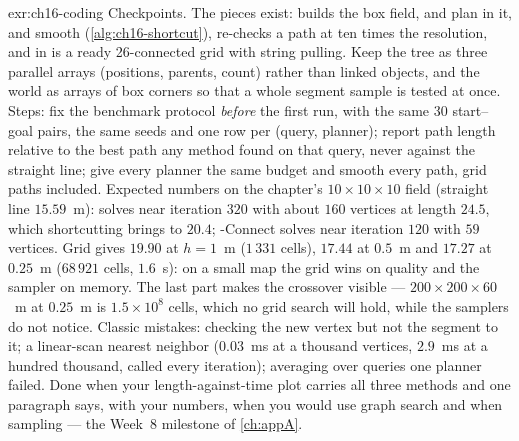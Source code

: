 
\begin{solution}{exr:ch16-coding}
Checkpoints. The pieces exist:  builds the box field,  and
 plan in it,  and  smooth
(\cref{alg:ch16-shortcut}),  re-checks a path at ten times the
resolution, and  in  is a ready
26-connected grid \astar with string pulling. Keep the tree as three parallel arrays
(positions, parents, count) rather than linked objects, and the world as arrays of box
corners so that a whole segment sample is tested at once. Steps: fix the benchmark
protocol \emph{before} the first run, with the same $30$ start--goal pairs, the same seeds
and one row per (query, planner); report path length relative to the best path any method
found on that query, never against the straight line; give every planner the same budget
and smooth every path, grid paths included. Expected numbers on the chapter's
$10\times10\times10$ field (straight line $15.59$~m): \rrt solves near iteration $320$
with about $160$ vertices at length $24.5$, which shortcutting brings to $20.4$;
\rrt-Connect solves near iteration $120$ with $59$ vertices. Grid \astar gives $19.90$ at
$h=1$~m ($1\,331$ cells), $17.44$ at $0.5$~m and $17.27$ at $0.25$~m ($68\,921$ cells,
$1.6$~s): on a small map the grid wins on quality and the sampler on memory. The last part
makes the crossover visible --- $200\times200\times60$~m at $0.25$~m is $1.5\times10^{8}$
cells, which no \python grid search will hold, while the samplers do not notice. Classic
mistakes: checking the new vertex but not the segment to it; a linear-scan nearest
neighbor ($0.03$~ms at a thousand vertices, $2.9$~ms at a hundred thousand, called every
iteration); averaging over queries one planner failed. Done when your length-against-time
plot carries all three methods and one paragraph says, with your numbers, when you would
use graph search and when sampling --- the Week~8 milestone of \cref{ch:appA}.
\end{solution}

